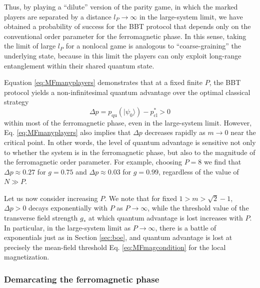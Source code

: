 \documentclass[prb,twocolumn,showpacs,amssymb,superscriptaddress]{revtex4-2}
\begin{document}
Thus, by playing a ``dilute'' version of the parity game, in which the marked players are separated by a distance $l_P \rightarrow \infty$ in the large-system limit, we have obtained a probability of success for the BBT protocol that depends only on the conventional order parameter for the ferromagnetic phase. In this sense, taking the limit of large $l_P$ for a nonlocal game is analogous to ``coarse-graining'' the underlying state\cite{cardy1996scaling}, because in this limit the players can only exploit long-range entanglement within their shared quantum state.

Equation \eqref{eq:MFmanyplayers} demonstrates that at a fixed finite $P$, the BBT protocol yields a non-infinitesimal quantum advantage over the optimal classical strategy
\begin{equation}
\Delta p = p_{\mathrm{qu}}(|\psi_0\rangle) - p_{\mathrm{cl}}^* > 0
\end{equation}
within most of the ferromagnetic phase, even in the large-system limit. However, Eq. \eqref{eq:MFmanyplayers} also implies that $\Delta p$ decreases rapidly as $m \to 0$ near the critical point.  In other words, the level of quantum advantage is sensitive not only to whether the system is in the ferromagnetic phase, but also to the magnitude of the ferromagnetic order parameter. For example, choosing $P = 8$ we find that $\Delta p \approx 0.27$ for $g=0.75$ and $\Delta p \approx 0.03$ for $g=0.99$, regardless of the value of $N \gg P$.

Let us now consider increasing $P$. We note that for fixed $1>m>\sqrt{2}-1$, $\Delta p > 0$ decays exponentially with $P$ as $P \to \infty$, while the threshold value of the transverse field strength $g_*$ at which quantum advantage is lost increases with $P$. In particular, in the large-system limit as $P \to \infty$, there is a battle of exponentials just as in Section \ref{sec:boe}, and quantum advantage is lost at precisely the mean-field threshold Eq. \eqref{eq:MFmagcondition} for the local magnetization.

\subsubsection{Demarcating the ferromagnetic phase}
\end{document}
